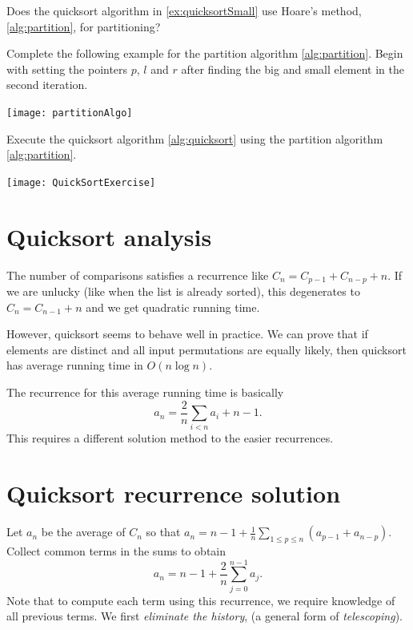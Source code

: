 \begin{Boxample}[1]
Does the quicksort algorithm in \cref{ex:quicksortSmall} use Hoare's method, \cref{alg:partition}, for partitioning? 
\end{Boxample}

\begin{Boxample}[1]
Complete the following example for the partition algorithm \cref{alg:partition}. 
Begin with setting the pointers $p$, $l$ and $r$ after finding the big and small element in the second iteration.
\begin{center}
\texttt{[image: partitionAlgo]}
\end{center}
\end{Boxample}

\begin{Boxample}[2]
Execute the quicksort algorithm \cref{alg:quicksort} using the partition algorithm \cref{alg:partition}.
\begin{center}
\texttt{[image: QuickSortExercise]}
\end{center}
\end{Boxample}

\section{Quicksort analysis}
The number of comparisons satisfies a recurrence like 
$C_n = C_{p-1} + C_{n - p} + n$. If we are unlucky (like when the list is already sorted), this degenerates to 
$C_{n} = C_{n-1} + n$ and we get quadratic running time.

However, quicksort seems to behave well in practice. We can prove that 
if elements are distinct and all input permutations are equally likely, then 
quicksort has average running time in $O(n \log n)$.

The recurrence for this average running time is basically
$$ a_n = \frac{2}{n} \sum_{i<n} a_i + n-1. $$ 
This requires a different solution method to the easier recurrences.

\section{Quicksort recurrence solution}
Let $a_n$ be the average of $C_n$ so that 
$a_n = n - 1 + \frac{1}{n} \sum_{1\leq p \leq n} (a_{p-1} + a_{n-p})$. 
Collect common terms in the sums to obtain
$$a_n = n - 1 + \frac{2}{n} \sum_{j=0}^{n-1} a_j.$$ 
Note that to compute each term using this recurrence, we require knowledge of all previous terms.
We first \emph{eliminate the history}, (a general form of \emph{telescoping}). 

